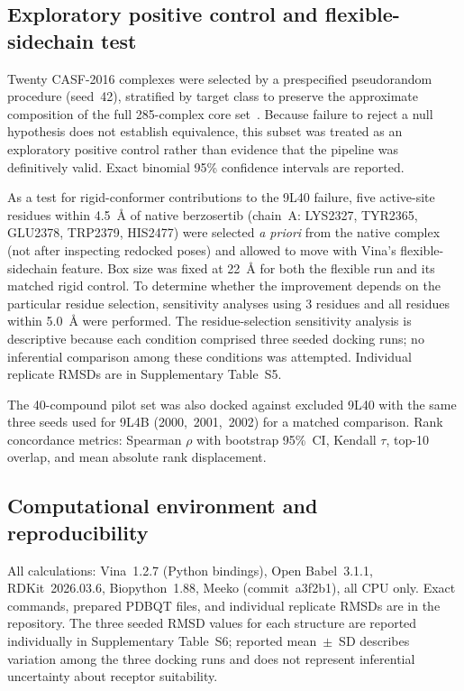 \documentclass[global,twocolumn]{svjour}
\begin{document}
\subsection{Exploratory positive control and flexible-sidechain test}

Twenty CASF-2016 complexes were selected by a prespecified pseudorandom
procedure (seed~42), stratified by target class to preserve the approximate
composition of the full 285-complex core set~\cite{zhang2023}. Because failure
to reject a null hypothesis does not establish equivalence, this subset was
treated as an exploratory positive control rather than evidence that the
pipeline was definitively valid. Exact binomial 95\% confidence intervals are
reported.

As a test for rigid-conformer contributions to the 9L40 failure, five
active-site residues within 4.5~\AA{} of native berzosertib (chain~A:
LYS2327, TYR2365, GLU2378, TRP2379, HIS2477) were selected \emph{a priori}
from the native complex (not after inspecting redocked poses) and allowed to
move with Vina's flexible-sidechain feature. Box size was fixed at 22~\AA{}
for both the flexible run and its matched rigid control. To determine whether
the improvement depends on the particular residue selection, sensitivity
analyses using 3 residues and all residues within 5.0~\AA{} were performed.
The residue-selection sensitivity analysis is descriptive because each
condition comprised three seeded docking runs; no inferential comparison among
these conditions was attempted. Individual replicate RMSDs are in
Supplementary Table~S5.

The 40-compound pilot set was also docked against excluded 9L40 with the
same three seeds used for 9L4B (2000,~2001,~2002) for a matched comparison.
Rank concordance metrics: Spearman $\rho$ with bootstrap 95\%~CI, Kendall
$\tau$, top-10 overlap, and mean absolute rank displacement.

\subsection{Computational environment and reproducibility}

All calculations: Vina~1.2.7 (Python bindings), Open Babel~3.1.1,
RDKit~2026.03.6, Biopython~1.88, Meeko (commit~a3f2b1), all CPU only.
Exact commands, prepared PDBQT files, and individual replicate RMSDs are in
the repository. The three seeded RMSD values for each structure are reported
individually in Supplementary Table~S6; reported mean~$\pm$~SD describes
variation among the three docking runs and does not represent inferential
uncertainty about receptor suitability.
\end{document}
